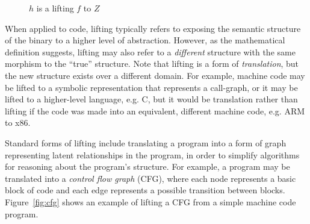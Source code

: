 \begin{figure}[h]
\centering
{}
\caption{$h$ is a lifting $f$ to $Z$}
\label{fig:lift}
\end{figure}

When applied to code, lifting typically refers to exposing the semantic structure of the binary to a higher level of abstraction.
However, as the mathematical definition suggests, lifting may also refer to a \emph{different} structure with the same morphism to the ``true'' structure.
Note that lifting is a form of \emph{translation}, but the new structure exists over a different domain.
For example, machine code may be lifted to a symbolic representation that represents a call-graph, or it may be lifted to a higher-level language, e.g. C, but it would be translation rather than lifting if the code was made into an equivalent, different machine code, e.g. ARM to x86.

Standard forms of lifting include translating a program into a form of graph representing latent relationships in the program, in order to simplify algorithms for reasoning about the program's structure.
For example, a program may be translated into a \emph{control flow graph} (CFG), where each node represents a basic block of code and each edge represents a possible transition between blocks.
Figure~\ref{fig:cfg} shows an example of lifting a CFG from a simple machine code program.

